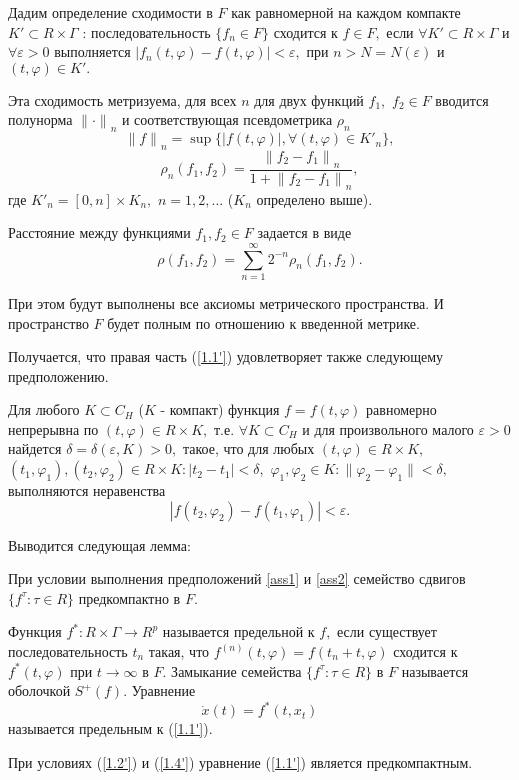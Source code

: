 	Дадим определение сходимости в $F$ как равномерной на каждом компакте
	$K'\subset R\times \Gamma $ : последовательность
	$\{f_n\in F\}$ сходится к $f\in F,$ если $\forall K'\subset
	R\times\Gamma $ и $\forall \varepsilon >0$ выполняется $|f_n(t,\varphi
	)-f(t,\varphi )|<\varepsilon,$ при $n>N=N(\varepsilon )$ и
	$(t,\varphi )\in K'.$
	
	Эта сходимость метризуема, для всех $n$ для двух функций $f_1,$
	$f_2\in F$ вводится полунорма ${\|\cdot \|}_n$ и соответствующая
	псевдометрика $\rho _n$  $${\| f\|
	}_n=\sup{\{|f(t,\varphi )|, \forall (t,\varphi )\in {K'}_n\} },$$
	$$\rho _n(f_1,f_2)=\frac{{\| f_2-f_1\| }_n}{1+{\| f_2-f_1\|
		}_n},$$ \noindent где ${K'}_n=[0,n]\times K_n,$ $n=1,2,\ldots $
	($K_n$ определено выше).
	
	Расстояние между функциями $f_1, f_2\in F$ задается в виде
	$$\rho (f_1,f_2)=\sum_{n=1}^{\infty }{2^{-n}\rho _n(f_1,f_2)}.
	\label{1.3'}$$
	
	При этом будут выполнены все аксиомы
	метрического пространства. И пространство
	$F$ будет полным по отношению к введенной метрике.
	
	Получается,  что правая  часть   (\ref{1.1'})   удовлетворяет   также
	следующему предположению.
	
	\begin{definition}\label{ass2} Для любого $K\subset C_H$ ($K$ - компакт)
		функция $f=f(t,\varphi )$ равномерно непрерывна по
		$(t, \varphi )\in R\times K,$ т.е. $\forall K\subset C_H$ и для произвольного малого $\varepsilon
		>0$ найдется $\delta =\delta (\varepsilon ,K)>0,$ такое, что для
		любых $(t,\varphi)\in R\times K,$ $(t_1,\varphi _1),
		(t_2,\varphi _2)\in R\times K: |t_2-t_1|<\delta,$ $\varphi _1,
		\varphi _2\in K:\|\varphi _2-\varphi _1\|<\delta,$ выполняются
		неравенства
		\begin{equation}
		|f(t_2,\varphi _2)-f(t_1,\varphi
		_1)|<\varepsilon. \label{1.4'}
		\end{equation}
	\end{definition}
	
	Выводится следующая лемма:
	
	\begin{lemma}\label{l-1.1} При условии выполнения предположений \ref{ass1} и \ref{ass2}
		семейство сдвигов $\{f^{\tau }:\tau\in R\}$
		предкомпактно в $F.$
	\end{lemma}
	
	\begin{definition}\label{d-1.1} Функция $f^*:R\times\Gamma \to R^p$ называется предельной
		к $f,$ если существует  последовательность ${t_n}$
		такая,  что ${f^{(n)}(t,\varphi )=f(t_n+t,\varphi )}$ сходится к
		$f^*(t,\varphi )$ при $t \to \infty$ в $F.$ Замыкание семейства $\{f^{\tau }:\tau \in
		R\}$ в $F$ называется оболочкой $S^+(f).$ Уравнение
		\begin{equation}
		\dot x(t)=f^*(t,x_t) \label{1.5'}
		\end{equation}
		называется предельным к (\ref{1.1'}).
	\end{definition}
	При  условиях (\ref{1.2'}) и (\ref{1.4'})
	уравнение  (\ref{1.1'}) является предкомпактным.
	

